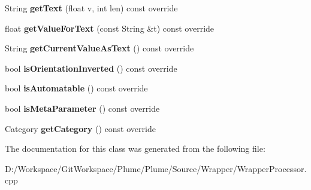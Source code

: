 \begin{DoxyCompactItemize}
\mbox{\label{class_wrapper_processor_1_1_wrapper_parameter_a1787bb1d5a49b6f552916ffd92f7d27b}} 
String {\bfseries get\+Text} (float v, int len) const override
\item 
\mbox{\label{class_wrapper_processor_1_1_wrapper_parameter_a2ae469144e680b0923ced6c8a148afb1}} 
float {\bfseries get\+Value\+For\+Text} (const String \&t) const override
\item 
\mbox{\label{class_wrapper_processor_1_1_wrapper_parameter_af58109040a6d7d4327801bb1a173ffa0}} 
String {\bfseries get\+Current\+Value\+As\+Text} () const override
\item 
\mbox{\label{class_wrapper_processor_1_1_wrapper_parameter_a02b2dba9deb597f8c32f62a5c7251ec4}} 
bool {\bfseries is\+Orientation\+Inverted} () const override
\item 
\mbox{\label{class_wrapper_processor_1_1_wrapper_parameter_aa8a3e3108f6781e1c33818120787713d}} 
bool {\bfseries is\+Automatable} () const override
\item 
\mbox{\label{class_wrapper_processor_1_1_wrapper_parameter_a34b8ea7ca040852f94d4feb0dd47c7c3}} 
bool {\bfseries is\+Meta\+Parameter} () const override
\item 
\mbox{\label{class_wrapper_processor_1_1_wrapper_parameter_a35b272d2f6175ca0461245c6a4b2f249}} 
Category {\bfseries get\+Category} () const override
\end{DoxyCompactItemize}


The documentation for this class was generated from the following file\+:\begin{DoxyCompactItemize}
\item 
D\+:/\+Workspace/\+Git\+Workspace/\+Plume/\+Plume/\+Source/\+Wrapper/Wrapper\+Processor.\+cpp\end{DoxyCompactItemize}
